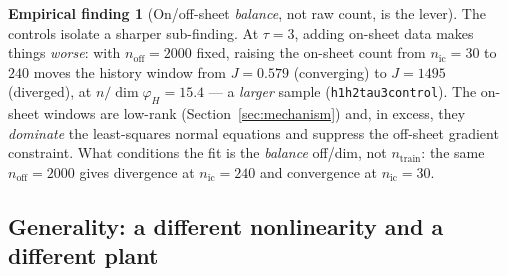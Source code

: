 \documentclass[11pt]{article}
\renewcommand{\_}{\discretionary{\textunderscore}{}{\textunderscore}}
\theoremstyle{plain}
\theoremstyle{definition}
\newtheorem{finding}[theorem]{Empirical finding}
\begin{document}
\begin{finding}[On/off-sheet \emph{balance}, not raw count, is the lever]\label{find:balance}
The controls isolate a sharper sub-finding. At $\tau=3$, adding on-sheet data makes things
\emph{worse}: with $n_{\mathrm{off}}=2000$ fixed, raising the on-sheet count from
$n_{\mathrm{ic}}=30$ to $240$ moves the history window from $J=0.579$ (converging) to $J=1495$
(diverged), at $n/\dim\varphi_H=15.4$ --- a \emph{larger} sample
(\texttt{h1h2\_tau3\_control}). The on-sheet windows are low-rank (Section~\ref{sec:mechanism})
and, in excess, they \emph{dominate} the least-squares normal equations and suppress the off-sheet
gradient constraint. What conditions the fit is the \emph{balance} off/dim, not $n_{\text{train}}$:
the same $n_{\mathrm{off}}=2000$ gives divergence at $n_{\mathrm{ic}}=240$ and convergence at
$n_{\mathrm{ic}}=30$.
\end{finding}

\subsection{Generality: a different nonlinearity and a different plant}
\end{document}
